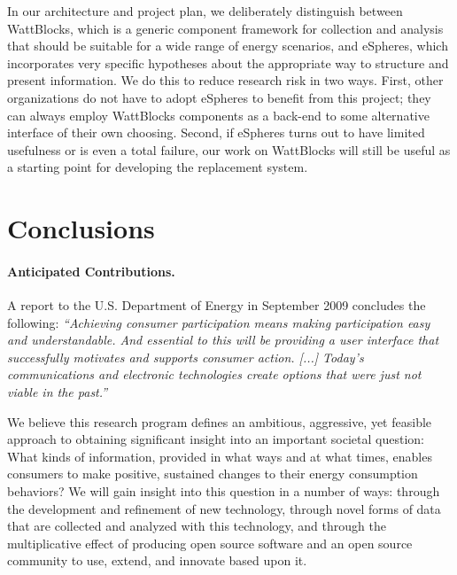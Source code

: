 
In our architecture and project plan, we deliberately distinguish between
WattBlocks, which is a generic component framework for collection and
analysis that should be suitable for a wide range of energy scenarios, and
eSpheres, which incorporates very specific hypotheses about the appropriate
way to structure and present information.  We do this to reduce research
risk in two ways. First, other organizations do not have to adopt eSpheres
to benefit from this project; they can always employ WattBlocks components
as a back-end to some alternative interface of their own choosing.  Second,
if eSpheres turns out to have limited usefulness or is even a total
failure, our work on WattBlocks will still be useful as a starting point
for developing the replacement system.

\section{Conclusions}
\label{sec:merit}

\paragraph{Anticipated Contributions.} A report to the U.S. Department of
Energy in September 2009 concludes the following:  {\em ``Achieving consumer participation means making participation easy and
  understandable.  And essential to this will be providing a user interface
  that successfully motivates and supports consumer action. [...] Today's
  communications and electronic technologies create options that were just
  not viable in the past.''} \cite{NETL:EnablesActiveParticipation}

We believe this research program defines an ambitious, aggressive, yet
feasible approach to obtaining significant insight into an important
societal question: What kinds of information, provided in what ways and at
what times, enables consumers to make positive, sustained changes to their
energy consumption behaviors?  We will gain insight into this question in a
number of ways: through the development and refinement of new technology,
through novel forms of data that are collected and analyzed with this
technology, and through the multiplicative effect of producing open source
software and an open source community to use, extend, and innovate based
upon it.


